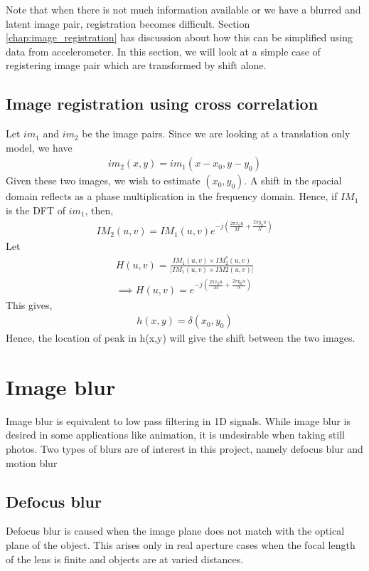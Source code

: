 \documentclass[BTech]{iitmdiss}
\begin{document}
Note that when there is not much information available or we have a 
blurred and latent image pair, registration becomes difficult. Section
\ref{chap:image_registration} has discussion about how this can be 
simplified using data from accelerometer. In this section, we will look
at a simple case of registering image pair which are transformed by shift
alone. %

\subsection{Image registration using cross correlation}
Let $im_1$ and $im_2$ be the image pairs. Since we are looking at a 
translation only model, we have
\begin{align*}
im_2(x,y)=im_1(x-x_0, y-y_0)
\end{align*}
Given these two images, we wish to estimate $(x_0,y_0)$. A shift in the
spacial domain reflects as a phase multiplication in the frequency domain.
Hence, if $IM_1$ is the DFT of $im_1$, then,
\begin{align*}
IM_2(u,v) = IM_1(u,v)e^{-j(\frac{2{\pi}x_0u}{M}+\frac{2{\pi}y_0u}{N})}
\end{align*}
Let
\begin{align*}
H(u,v) = \frac{IM_1(u,v){\times}IM_2^*(u,v)}{|IM_1(u,v){\times}IM2(u,v)|}\\
\implies H(u,v) = e^{-j(\frac{2{\pi}x_0u}{M}+\frac{2{\pi}y_0u}{N})}
\end{align*}
This gives,
\begin{align*}
h(x,y) = \delta(x_0, y_0)
\end{align*}
Hence, the location of peak in h(x,y) will give the shift between the 
two images. 
\section{Image blur}
\label{basic_theory:image_blur}
Image blur is equivalent to low pass filtering in 1D signals. While 
image blur is desired in some applications like animation, it is 
undesirable when taking still photos. Two types of blurs are of interest
in this project, namely defocus blur and motion blur

\subsection{Defocus blur}
\label{basic_theory:image_blur:optical}
Defocus blur is caused when the image plane does not match with the 
optical plane of the object. This arises only in real aperture cases
when the focal length of the lens is finite and objects are at varied
distances. 
\end{document}
